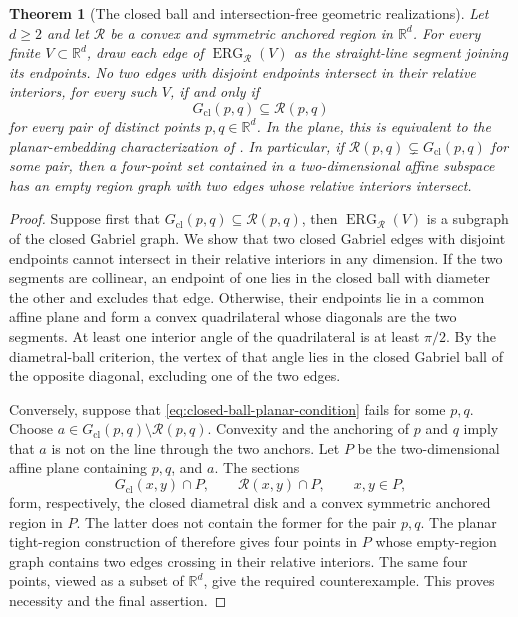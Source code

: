 \documentclass[a4paper,fleqn]{cas-sc}
\newtheorem{theorem}{Theorem}
\theoremstyle{definition}
\theoremstyle{remark}
\newcommand{\R}{\mathds{R}}
\newcommand{\0}{\mathbf{0}}
\begin{document}
\begin{theorem}[The closed ball and intersection-free geometric realizations]
\label{thm:closed-ball-planar-embedding}
Let $d\geq2$ and let $\mathcal R$ be a convex and symmetric anchored region
in $\R^d$. For every finite $V\subset\R^d$, draw each edge of
$\operatorname{ERG}_{\mathcal R}(V)$ as the straight-line segment joining
its endpoints. No two edges with disjoint endpoints intersect in their
relative interiors, for every such $V$, if and only if
\begin{equation}\label{eq:closed-ball-planar-condition}
    G_{\mathrm{cl}}(p,q)\subseteq\mathcal R(p,q)
\end{equation}
for every pair of distinct points $p,q\in\R^d$. In the plane, this is
equivalent to the planar-embedding characterization of
\citet[Theorem~11]{cardinal2009empty}. In particular, if
$\mathcal R(p,q)\subsetneq G_{\mathrm{cl}}(p,q)$ for some pair, then a
four-point set contained in a two-dimensional affine subspace has an empty
region graph with two edges whose relative interiors intersect.
\end{theorem}

\begin{proof}
Suppose first that
$G_{\mathrm{cl}}(p,q)\subseteq\mathcal R(p,q)$, then
$\operatorname{ERG}_{\mathcal R}(V)$ is a subgraph of the closed Gabriel
graph. We show that two closed Gabriel edges with disjoint endpoints cannot
intersect in their relative interiors in any dimension. If the two segments
are collinear, an endpoint of one lies in the closed ball with diameter the
other and excludes that edge. Otherwise, their endpoints lie in a common
affine plane and form a convex quadrilateral whose diagonals are the two
segments. At least one interior angle of the quadrilateral is at least
$\pi/2$. By the diametral-ball criterion, the vertex of that angle lies in
the closed Gabriel ball of the opposite diagonal, excluding one of the two
edges.

Conversely, suppose that \eqref{eq:closed-ball-planar-condition} fails for
some $p,q$. Choose
$a\in G_{\mathrm{cl}}(p,q)\setminus\mathcal R(p,q)$. Convexity and the
anchoring of $p$ and $q$ imply that $a$ is not on the line through the two
anchors. Let $P$ be the two-dimensional affine plane containing $p,q$, and
$a$. The sections
\begin{equation}
    G_{\mathrm{cl}}(x,y)\cap P,
    \qquad
    \mathcal R(x,y)\cap P,
    \qquad x,y\in P,
\end{equation}
form, respectively, the closed diametral disk and a convex symmetric
anchored region in $P$. The latter does not contain the former for the pair
$p,q$. The planar tight-region construction of
\citet[Theorem~11]{cardinal2009empty} therefore gives four points in $P$
whose empty-region graph contains two edges crossing in their relative
interiors. The same four points, viewed as a subset of $\R^d$, give the
required counterexample. This proves necessity and the final assertion.
\end{proof}
\end{document}
